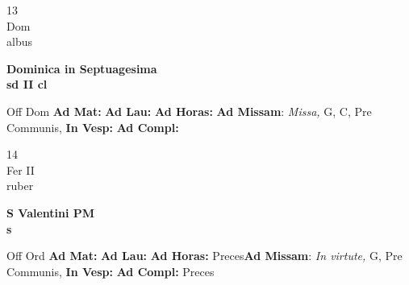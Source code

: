 \documentclass[10pt, openany]{book}
\begin{document}
        \begin{center}
            \begin{minipage}{3.5in}
                \vspace{2em}
                \begin{minipage}{0.5in}
                    {\Huge 13} \\
                    {\normalsize Dom} \\
                    {\normalsize albus}
                \end{minipage}
                \begin{minipage}{3.0in}
                    \textbf{ \large Dominica in Septuagesima \\
                    \textnormal{\normalsize sd II cl}} \\ 
                \end{minipage}
                \begin{justify}Off Dom
                    \textbf{Ad Mat: }
                    \textbf{Ad Lau: }
                    \textbf{Ad Horas: }\textbf{Ad Missam}: \textit{Missa,} G, C, Pre Communis,  
                    \textbf{In Vesp: }
                    \textbf{Ad Compl: }
                \end{justify}
            \end{minipage}
        \end{center}
    
        \begin{center}
            \begin{minipage}{3.5in}
                \vspace{2em}
                \begin{minipage}{0.5in}
                    {\Huge 14} \\
                    {\normalsize Fer II} \\
                    {\normalsize ruber}
                \end{minipage}
                \begin{minipage}{3.0in}
                    \textbf{ \large S Valentini PM \\
                    \textnormal{\normalsize s}} \\ 
                \end{minipage}
                \begin{justify}Off Ord
                    \textbf{Ad Mat: }
                    \textbf{Ad Lau: }
                    \textbf{Ad Horas: }Preces\textbf{Ad Missam}: \textit{In virtute,} G, Pre Communis,  
                    \textbf{In Vesp: }
                    \textbf{Ad Compl: }Preces
                \end{justify}
            \end{minipage}
        \end{center}
    
\end{document}
